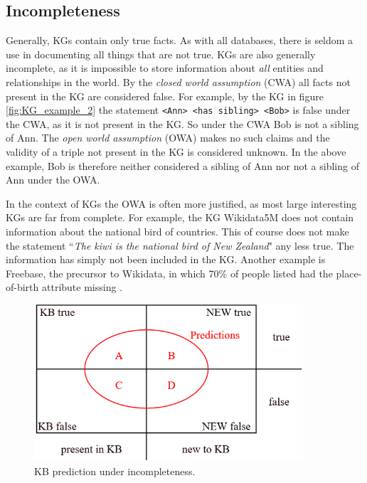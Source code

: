 \subsection{Incompleteness}
\label{Integrity_of_KGs}
Generally, KGs contain only true facts. As with all databases, there is seldom a use in documenting all things that are not true. KGs are also generally incomplete, as it is impossible to store information about \textit{all} entities and relationships in the world. By the \textit{closed world assumption} (CWA) all facts not present in the KG are considered false. For example, by the KG in figure \ref{fig:KG_example_2} the statement \texttt{<Ann> <has sibling> <Bob>} is false under the CWA, as it is not present in the KG. So under the CWA Bob is not a sibling of Ann. The \textit{open world assumption} (OWA) makes no such claims and  the validity of a triple not present in the KG is considered unknown. In the above example, Bob is therefore neither considered a sibling of Ann nor not a sibling of Ann under the OWA.

In the context of KGs the OWA is often more justified, as most large interesting KGs are far from complete. For example, the KG Wikidata5M does not contain information about the national bird of countries. This of course does not make the statement ``\textit{The kiwi is the national bird of New Zealand}" any less true. The information has simply not been included in the KG. Another example is Freebase, the precursor to Wikidata, in which 70\% of people listed had the place-of-birth attribute missing \cite{west2014knowledge}.

\begin{figure}[htp]
    \centering
    \includegraphics[width=10cm]{figures/kb_venn.png}
    \caption{KB prediction under incompleteness.}
    \label{KB_predictions}
\end{figure}

